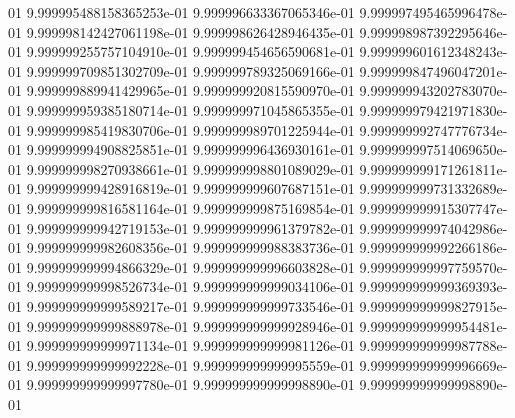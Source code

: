 01	9.999995488158365253e-01	9.999996633367065346e-01	9.999997495465996478e-01	9.999998142427061198e-01	9.999998626428946435e-01	9.999998987392295646e-01	9.999999255757104910e-01	9.999999454656590681e-01	9.999999601612348243e-01	9.999999709851302709e-01	9.999999789325069166e-01	9.999999847496047201e-01	9.999999889941429965e-01	9.999999920815590970e-01	9.999999943202783070e-01	9.999999959385180714e-01	9.999999971045865355e-01	9.999999979421971830e-01	9.999999985419830706e-01	9.999999989701225944e-01	9.999999992747776734e-01	9.999999994908825851e-01	9.999999996436930161e-01	9.999999997514069650e-01	9.999999998270938661e-01	9.999999998801089029e-01	9.999999999171261811e-01	9.999999999428916819e-01	9.999999999607687151e-01	9.999999999731332689e-01	9.999999999816581164e-01	9.999999999875169854e-01	9.999999999915307747e-01	9.999999999942719153e-01	9.999999999961379782e-01	9.999999999974042986e-01	9.999999999982608356e-01	9.999999999988383736e-01	9.999999999992266186e-01	9.999999999994866329e-01	9.999999999996603828e-01	9.999999999997759570e-01	9.999999999998526734e-01	9.999999999999034106e-01	9.999999999999369393e-01	9.999999999999589217e-01	9.999999999999733546e-01	9.999999999999827915e-01	9.999999999999888978e-01	9.999999999999928946e-01	9.999999999999954481e-01	9.999999999999971134e-01	9.999999999999981126e-01	9.999999999999987788e-01	9.999999999999992228e-01	9.999999999999995559e-01	9.999999999999996669e-01	9.999999999999997780e-01	9.999999999999998890e-01	9.999999999999998890e-01
